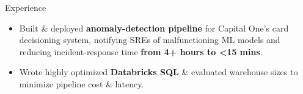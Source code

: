 \documentclass{resume} %
\begin{document}
\begin{workSection}{Experience}
	\experienceItem[
		company=Capital One,
		location=McLean{,} VA,
		position=Software Engineering Intern,
		duration= June 2025 - August 2025,
	]
	\begin{itemize}
		\vspace{-0.5em}
		\itemsep -6pt {}
		\item Built \& deployed \textbf{anomaly-detection pipeline} for Capital One's card decisioning system, notifying SREs of malfunctioning ML models and reducing incident-response time \textbf{from 4+ hours to <15 mins}.
		\item Wrote highly optimized \textbf{Databricks SQL} \& evaluated warehouse sizes to minimize pipeline cost \& latency.

		

\end{itemize}
\end{workSection}
\end{document}
